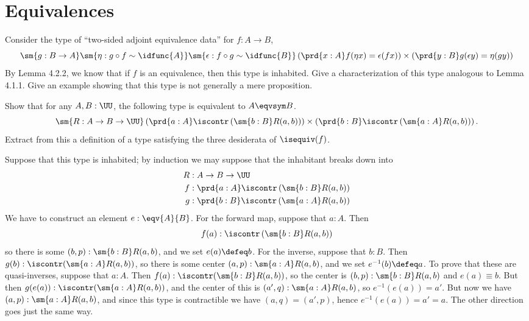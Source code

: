 \begin{coqdoccode}
\end{coqdoccode}
\section{Equivalences}



Consider the type of ``two-sided adjoint equivalence data'' for $f : A \to B$,
\[
  \sm{g:B \to A} 
  \sm{\eta : g \circ f \sim \idfunc{A}}
  \sm{\epsilon : f \circ g \sim \idfunc{B}}
  \left(\prd{x:A} f(\eta x) = \epsilon(f x)\right)
    \times
  \left(\prd{y:B} g(\epsilon y) = \eta(g y)\right)
\]
By Lemma 4.2.2, we know that if $f$ is an equivalence, then this type is
inhabited.  Give a characterization of this type analogous to Lemma 4.1.1.
Give an example showing that this type is not generally a mere proposition.


Show that for any $A, B : \UU$, the following type is equivalent to $A \eqvsym
B$.
\[
  \sm{R : A \to B \to \UU}
  \left(\prd{a:A} \iscontr \left(\sm{b:B} R(a, b)\right)\right)
  \times
  \left(\prd{b:B} \iscontr \left(\sm{a:A} R(a, b)\right)\right).
\]
Extract from this a definition of a type satisfying the three desiderata of
$\isequiv(f)$.


 \soln
Suppose that this type is inhabited; by induction we may suppose that the
inhabitant breaks down into
\begin{align*}
  R &: A \to B \to \UU \\
  f &: \prd{a:A} \iscontr\left(\sm{b:B}R(a, b)\right) \\
  g &: \prd{b:B} \iscontr\left(\sm{a:A}R(a, b)\right)
\end{align*}
We have to construct an element $e : \eqv{A}{B}$.  For the forward map, suppose
that $a : A$.  Then
\[
  f(a) : \iscontr\left(\sm{b:B}R(a, b)\right)
\]
so there is some $(b, p) : \sm{b:B}R(a,b)$, and we set $e(a) \defeq b$.  For
the inverse, suppose that $b:B$.  Then $g(b) : \iscontr(\sm{a:A}R(a, b))$, so
there is some center $(a, p) : \sm{a:A}R(a,b)$, and we set $e^{-1}(b) \defeq
a$.  To prove that these are quasi-inverses, suppose that $a : A$.  Then $f(a)
: \iscontr(\sm{b:B}R(a,b))$, so the center is $(b, p) : \sm{b:B}R(a,b)$ and
$e(a) \equiv b$.  But then $g(e(a)) : \iscontr(\sm{a:A}R(a, b))$, and the
center of this is $(a', q) : \sm{a:A}R(a,b)$, so $e^{-1}(e(a)) = a'$.  But
now we have $(a, p) : \sm{a:A}R(a, b)$, and since this type is contractible we
have $(a, q) = (a', p)$, hence $e^{-1}(e(a)) = a' = a$.  The other direction
goes just the same way.


